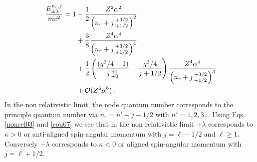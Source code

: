 \begin{alignat}{1}
\label{nonrel03} \frac{E^{n_{r},j}_{\pm\lambda}}{mc^{2}}=1&-\frac{1}{2}\frac{Z^{2}\alpha^{2}}{\left(n_{r}+j\begin{smallmatrix}+3/2 \\ +1/2\end{smallmatrix}\right)^{2}}\\
\notag &+\frac{3}{8}\frac{Z^{4}\alpha^{4}}{\left(n_{r}+j\begin{smallmatrix}+3/2 \\ +1/2\end{smallmatrix}\right)^{4}}\\ 
\notag &+\frac{1}{2}\left(\frac{(g^{2}/4-1)}{j\begin{smallmatrix}+1 \\ +0\end{smallmatrix}}-\frac{g^{2}/4}{j+1/2}\right)\frac{Z^{4}\alpha^{4}}{\left(n_{r}+j\begin{smallmatrix}+3/2 \\ +1/2\end{smallmatrix}\right)^{3}}\\
\notag &+\mathcal{O}(Z^{6}\alpha^{6})\;.
\end{alignat}
In the non relativistic limit, the node quantum number corresponds to the principle quantum number via $n_{r}=n'-j-1/2$ with $n'=1,2,3\ldots$ Using Eqs.\,\eqref{nonrel03} and \eqref{cou07} we see that in the non relativistic limit $+\lambda$ corresponds to $\kappa>0$ or anti-aligned spin-angular momentum with $j=\ell-1/2$ and $\ell\geq1$. Conversely $-\lambda$ corresponds to $\kappa<0$ or aligned spin-angular momentum with $j=\ell+1/2$. 

